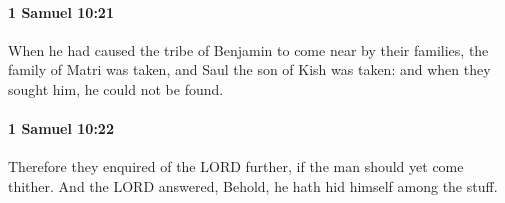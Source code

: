 		\paragraph{1 Samuel 10:21} %
			\label{1SAMUEL-10-21}

			When he had caused the tribe of Benjamin to come near by their families, the family of Matri was taken, and Saul the son of Kish was taken: and when they sought him, he could not be found.


		\paragraph{1 Samuel 10:22} %
			\label{1SAMUEL-10-22}

			Therefore they enquired of the LORD further, if the man should yet come thither. And the LORD answered, Behold, he hath hid himself among the stuff.


